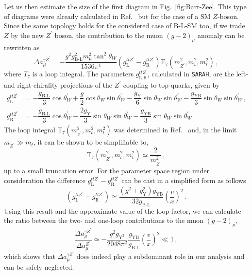 \documentclass[10pt]{book}
\newcommand{\ro}[1]{\textrm{#1}}
\renewcommand{\(}{\left(}
\renewcommand{\)}{\right)}
\renewcommand{\[}{\left[}
\renewcommand{\]}{\right]}
\begin{document}
{ \color{gray}
Let us then estimate the size of the first diagram in Fig.~\ref{fig:Barr-Zee}. This type of diagrams were already calculated in Ref.~\cite{Feng:2009gn} but for the case of a SM $Z$-boson. Since the same topology holds for the considered case of B-L-SM too, 
if we trade $Z$ by the new $Z^\prime$ boson, the contribution to the muon $(g-2)_\mu$ anomaly can be rewritten as
\begin{equation}
    \Delta a_{\mu}^{\gamma Z^\prime} = -\dfrac{g^2 g^2_{\ro{B-L}} m_\mu^2 \tan^2{\theta_W}}{1536 \pi^4} \left( g_{\ro{L}}^{ttZ^\prime} - g_{\ro{R}}^{ttZ^\prime} \right) \ro{T}_7\left( m_{Z^\prime}^2, m_t^2, m_t^2 \right)\,,
    \label{eq:agZ}
\end{equation}
where $T_7$ is a loop integral. %
%
The parameters $g_{\ro{L,R}}^{ttZ^\prime}$, calculated in \texttt{SARAH}, are the left- and right-chirality projections of the $Z^\prime$ coupling to top-quarks, given by
\begin{equation}
\begin{aligned}
    g_{\ro{L}}^{ttZ^\prime} &= -\dfrac{g_{\ro{B-L}}}{3} \cos{\theta_W^\prime} + \dfrac{g}{2} \cos{\theta_W} \sin{\theta_W^\prime} - \dfrac{g_{\ro{Y}}}{6} \sin{\theta_W} \sin{\theta_W^\prime} - \dfrac{g_{\ro{YB}}}{3} \sin{\theta_W} \sin{\theta_W^\prime}\,,
    \\
    g_{\ro{R}}^{ttZ^\prime} &= -\dfrac{g_{\ro{B-L}}}{3} \cos{\theta_W^\prime} - \dfrac{2 g_{\ro{Y}}}{3} \sin{\theta_W} \sin{\theta_W^\prime} - \dfrac{g_{\ro{YB}}}{3} \sin{\theta_W} \sin{\theta_W^\prime}\,.
\end{aligned}
\end{equation}
The loop integral $\ro{T}_7 \(m_{Z^\prime}^2, m_t^2, m_t^2\)$ was determined in Ref.~\cite{Feng:2009gn} and, in the limit $m_{Z^\prime} \gg m_t$, 
it can be shown to be simplifiable to, 
\begin{equation}
    \ro{T}_7 \(m_{Z^\prime}^2, m_t^2, m_t^2\) \simeq \frac{2}{m_{Z^\prime}^2} \,,
    \label{eq:T7}
\end{equation}
up to a small truncation error. %
For the parameter space region under consideration the difference $g_{\ro{L}}^{ttZ^\prime} - g_{\ro{R}}^{ttZ^\prime}$ can be cast in a simplified form as follows 
\begin{equation}
    \left(g_{\ro{L}}^{ttZ^\prime} - g_{\ro{R}}^{ttZ^\prime}\right) \simeq \dfrac{\left(g^2+g_{\ro{Y}}^2\right)g_{\ro{YB}}}{32 g_{\ro{B-L}}} \left(\dfrac{v}{x}\right)^2\,.
    \label{eq:gLminusgR}
\end{equation}
Using this result and the approximate value of the loop factor, we can calculate the ratio between 
the two- and one-loop contributions to the muon $(g-2)_{\mu}$,
\begin{equation}
    \dfrac{\Delta a_{\mu}^{\gamma Z^\prime}}{\Delta a_{\mu}^{Z^\prime}} \simeq -\dfrac{g^2 g_{\ro{Y}^2}}{2048 \pi^2} \dfrac{g_{\ro{YB}}}{g_{\ro{B-L}}} \left( \dfrac{v}{x} \right)^2 \ll 1\,,
\end{equation}
which shows that $\Delta a_\mu^{\gamma Z^\prime}$ does indeed play a subdominant role in our analysis and can be safely neglected. } 
\end{document}
